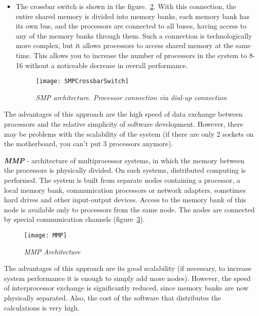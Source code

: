 {\begin{itemize}
\begin{figure}[H]
					\caption{\textit{SMP architecture. Processor connection via system bus}}
					\label{SMPSystemBus:image}
				\end{figure}
			\item The crossbar switch is shown in the figure.~\ref{SMPCrossbarSwitch:image}. With this connection, the entire shared memory is divided into memory banks, each memory bank has its own bus, and the processors are connected to all buses, having access to any of the memory banks through them. Such a connection is technologically more complex, but it allows processors to access shared memory at the same time. This allows you to increase the number of processors in the system to 8-16 without a noticeable decrease in overall performance.
				\begin{figure}[H]
					\texttt{[image: SMPCrossbarSwitch]}
					\caption{\textit{SMP architecture. Processor connection via dial-up connection}}
					\label{SMPCrossbarSwitch:image}
				\end{figure}
		\end{itemize}
	\par The advantages of this approach are the high speed of data exchange between processors and the relative simplicity of software development. However, there may be problems with the scalability of the system (if there are only 2 sockets on the motherboard, you can’t put 3 processors anymore).
	\par\textbf{\textit{MMP}} - architecture of multiprocessor systems, in which the memory between the processors is physically divided. On such systems, distributed computing is performed. The system is built from separate nodes containing a processor, a local memory bank, communication processors or network adapters, sometimes hard drives and other input-output devices. Access to the memory bank of this node is available only to processors from the same node. The nodes are connected by special communication channels (figure~\ref{MMP:image}).
		\begin{figure}[H]
			\texttt{[image: MMP]}
			\caption{\textit{MMP Architecture}}
			\label{MMP:image}
		\end{figure}
	\par The advantages of this approach are its good scalability (if necessary, to increase system performance it is enough to simply add more nodes). However, the speed of interprocessor exchange is significantly reduced, since memory banks are now physically separated. Also, the cost of the software that distributes the calculations is very high.
	\par
}